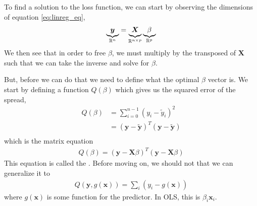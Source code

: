 \documentclass[11pt]{article}
\begin{document}
To find a solution to the loss function, we can start by observing the dimensions of equation \eqref{eq:linreg_eq},
\begin{align}
    \underbrace{\vphantom{\beta}\bm{y}}_{\mathbb{R}^{n}} = \underbrace{\vphantom{\beta}\bm{X}}_{\mathbb{R}^{n\times p}} \underbrace{\beta}_{\mathbb{R}^{p}}
    \label{eq:matrix_eq_solution}
\end{align}
We then see that in order to free $\beta$, we must multiply by the transposed of $\bm{X}$ such that we can take the inverse and solve for $\beta$.

But, before we can do that we need to define what the optimal $\beta$ vector is. We start by defining a function $Q(\beta)$ which gives us the squared error of the spread,
\begin{align*}
    Q(\beta) &= \sum^{n-1}_{i=0} (y_i - \tilde{y}_i)^2 \\
    &= (\bm{y} - \tilde{\bm{y}})^T (\bm{y} - \tilde{\bm{y}}) \\
\end{align*}
which is the matrix equation
\begin{align}
    Q(\beta) = (\bm{y} - \bm{X}\beta)^T (\bm{y} - \bm{X}\beta)
    \label{eq:ols_cost_function}
\end{align}
This equation is called the  \citep[p. 12]{2018arXiv180308823M}. Before moving on, we should not that we can generalize it to
\begin{align}
    Q(\bm{y}, g(\bm{x})) = \sum_i \left(y_i - g(\bm{x}) \right)
    \label{eq:reg_cost_func}
\end{align}
where $g(\bm{x})$ is some function for the predictor. In OLS, this is $\beta_i \bm{x}_i$.
\end{document}

